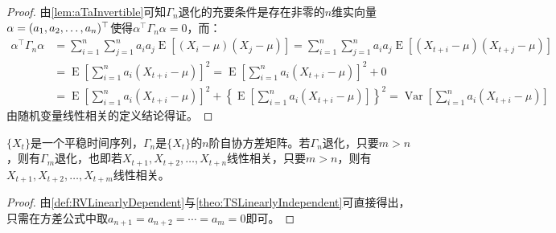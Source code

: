 \begin{proof}
	由\cref{lem:aTaInvertible}可知$\Gamma_n$退化的充要条件是存在非零的$n$维实向量$\alpha=(a_1, a_2, \dots, a_{n})^{\top}$使得$\alpha^{\top}\Gamma_n\alpha=0$，而：
	\begin{align*}
		\alpha^{\top}\Gamma_n\alpha
		&=\sum_{i=1}^{n}\sum_{j=1}^{n}a_ia_j\operatorname{E}[(X_i-\mu)(X_j-\mu)] =\sum_{i=1}^{n}\sum_{j=1}^{n}a_ia_j\operatorname{E}[(X_{t+i}-\mu)(X_{t+j}-\mu)] \\
		&=\operatorname{E}\left[\sum_{i=1}^{n}a_i(X_{t+i}-\mu)\right]^2 =\operatorname{E}\left[\sum_{i=1}^{n}a_i(X_{t+i}-\mu)\right]^2+0 \\
		&=\operatorname{E}\left[\sum_{i=1}^{n}a_i(X_{t+i}-\mu)\right]^2+\left\{\operatorname{E}\left[\sum_{i=1}^{n}a_i(X_{t+i}-\mu)\right]\right\}^2 =\operatorname{Var}\left[\sum_{i=1}^{n}a_i(X_{t+i}-\mu)\right]
	\end{align*}
	由随机变量线性相关的定义结论得证。
\end{proof}
\begin{theorem}
	$\{X_t\}$是一个平稳时间序列，$\Gamma_n$是$\{X_t\}$的$n$阶自协方差矩阵。若$\Gamma_n$退化，只要$m>n$，则有$\Gamma_m$退化，也即若$X_{t+1},X_{t+2},\dots,X_{t+n}$线性相关，只要$m>n$，则有$X_{t+1},X_{t+2},\dots,X_{t+m}$线性相关。
\end{theorem}
\begin{proof}
	由\cref{def:RVLinearlyDependent}与\cref{theo:TSLinearlyIndependent}可直接得出，只需在方差公式中取$a_{n+1}=a_{n+2}=\cdots=a_{m}=0$即可。
\end{proof}

